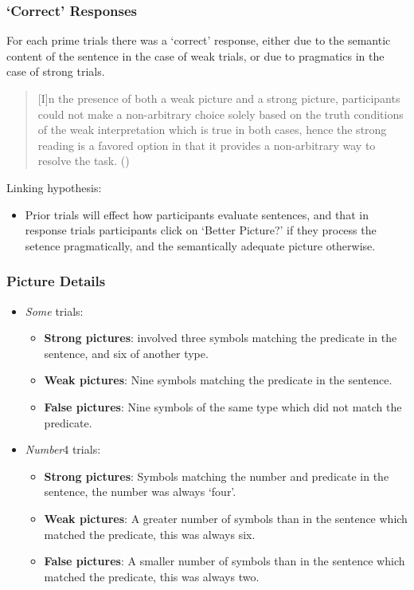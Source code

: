 \documentclass[noamssymb]{beamer}
\newcommand{\hand}{\ding{43}}
\begin{document}
\begin{frame}
\end{frame}

\begin{frame}
  \frametitle{{\ftf `Correct' Responses}}

  For each prime trials there was a `correct' response, either due to the semantic content of the sentence in the case of weak trials, or due to pragmatics in the case of strong trials.
  \begin{quote}
    [I]n the presence of both a weak picture and a strong picture, participants could not make a non-arbitrary choice solely based on the truth conditions of the weak interpretation which is true in both cases, hence the strong reading is a favored option in that it provides a non-arbitrary way to resolve the task.\nolinebreak
    \hfill(\citeyear[124]{Bott:2016aa})
  \end{quote}


  Linking hypothesis:
  \begin{itemize}
  \item[\hand] Prior trials will effect how participants evaluate sentences, and that in response trials participants click on `Better Picture?' if they process the setence pragmatically, and the semantically adequate picture otherwise.
  \end{itemize}
\end{frame}

\begin{frame}
  \frametitle{{\ftf Picture Details}}

  \begin{itemize}
  \item \emph{Some} trials:
    \begin{itemize}
    \item \textbf{Strong pictures}: involved three symbols matching the predicate in the sentence, and six of another type.
    \item \textbf{Weak pictures}: Nine symbols matching the predicate in the sentence.
    \item \textbf{False pictures}: Nine symbols of the same type which did not match the predicate.
    \end{itemize}

    \item \emph{Number}4 trials:
    \begin{itemize}
    \item \textbf{Strong pictures}: Symbols matching the number and predicate in the sentence, the number was always `four'.
    \item \textbf{Weak pictures}:  A greater number of symbols than in the sentence which matched the predicate, this was always six.
    \item \textbf{False pictures}: A smaller number of symbols than in the sentence which matched the predicate, this was always two.
    \end{itemize}
  \end{itemize}

\end{frame}
\end{document}
